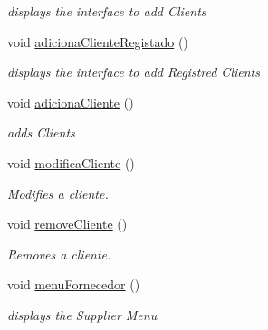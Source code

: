 \begin{DoxyCompactItemize}
\begin{DoxyCompactList}\small\item\em displays the interface to add Clients \end{DoxyCompactList}\item 
\mbox{\label{classEmpresa_a430c00a63ef70338de3b4b7c096ea194}} 
void \hyperlink{classEmpresa_a430c00a63ef70338de3b4b7c096ea194}{adiciona\+Cliente\+Registado} ()
\begin{DoxyCompactList}\small\item\em displays the interface to add Registred Clients \end{DoxyCompactList}\item 
\mbox{\label{classEmpresa_aba4af6a945948ac66e771a416cfc2a2a}} 
void \hyperlink{classEmpresa_aba4af6a945948ac66e771a416cfc2a2a}{adiciona\+Cliente} ()
\begin{DoxyCompactList}\small\item\em adds Clients \end{DoxyCompactList}\item 
\mbox{\label{classEmpresa_a9b938f2436e95e68afce6cc04f2100bc}} 
void \hyperlink{classEmpresa_a9b938f2436e95e68afce6cc04f2100bc}{modifica\+Cliente} ()
\begin{DoxyCompactList}\small\item\em Modifies a cliente. \end{DoxyCompactList}\item 
\mbox{\label{classEmpresa_ab9af9446d6d2c206b4b3e18e1bcb6475}} 
void \hyperlink{classEmpresa_ab9af9446d6d2c206b4b3e18e1bcb6475}{remove\+Cliente} ()
\begin{DoxyCompactList}\small\item\em Removes a cliente. \end{DoxyCompactList}\item 
\mbox{\label{classEmpresa_adb9d8d4aa55f253fc534e220ca4a87ac}} 
void \hyperlink{classEmpresa_adb9d8d4aa55f253fc534e220ca4a87ac}{menu\+Fornecedor} ()
\begin{DoxyCompactList}\small\item\em displays the Supplier Menu \end{DoxyCompactList}\item 
\mbox{\label{classEmpresa_af20261a3f95a5dd0c4a5a796d9a3d442}} 

\end{DoxyCompactItemize}
